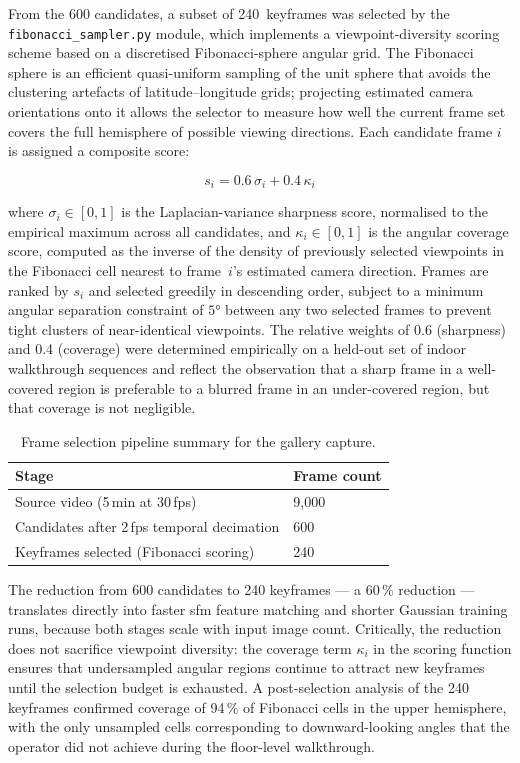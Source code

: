 From the 600 candidates, a subset of 240~keyframes was selected by the \texttt{fibonacci\_sampler.py} module, which implements a viewpoint-diversity scoring scheme based on a discretised Fibonacci-sphere angular grid. The Fibonacci sphere is an efficient quasi-uniform sampling of the unit sphere that avoids the clustering artefacts of latitude--longitude grids; projecting estimated camera orientations onto it allows the selector to measure how well the current frame set covers the full hemisphere of possible viewing directions. Each candidate frame $i$ is assigned a composite score:

\begin{equation}
  s_i = 0.6\,\sigma_i + 0.4\,\kappa_i
  \label{eq:fib-score}
\end{equation}

\noindent where $\sigma_i \in [0,1]$ is the Laplacian-variance sharpness score, normalised to the empirical maximum across all candidates, and $\kappa_i \in [0,1]$ is the angular coverage score, computed as the inverse of the density of previously selected viewpoints in the Fibonacci cell nearest to frame~$i$'s estimated camera direction. Frames are ranked by $s_i$ and selected greedily in descending order, subject to a minimum angular separation constraint of $5°$ between any two selected frames to prevent tight clusters of near-identical viewpoints. The relative weights of 0.6 (sharpness) and 0.4 (coverage) were determined empirically on a held-out set of indoor walkthrough sequences and reflect the observation that a sharp frame in a well-covered region is preferable to a blurred frame in an under-covered region, but that coverage is not negligible.

\begin{table}[htbp]
  \centering
  \caption{Frame selection pipeline summary for the gallery capture.}
  \label{tab:frame-selection}
  \begin{tabular}{@{}L{7.0cm} R{3.0cm}@{}}
    \toprule
    \textbf{Stage} & \textbf{Frame count} \\
    \midrule
    Source video (5\,min at 30\,fps)              & 9,000 \\
    Candidates after 2\,fps temporal decimation   & 600 \\
    Keyframes selected (Fibonacci scoring)        & 240 \\
    \bottomrule
  \end{tabular}
\end{table}

The reduction from 600 candidates to 240 keyframes — a 60\,\% reduction — translates directly into faster \acrshort{sfm} feature matching and shorter Gaussian training runs, because both stages scale with input image count. Critically, the reduction does not sacrifice viewpoint diversity: the coverage term $\kappa_i$ in the scoring function ensures that undersampled angular regions continue to attract new keyframes until the selection budget is exhausted. A post-selection analysis of the 240 keyframes confirmed coverage of 94\,\% of Fibonacci cells in the upper hemisphere, with the only unsampled cells corresponding to downward-looking angles that the operator did not achieve during the floor-level walkthrough.

